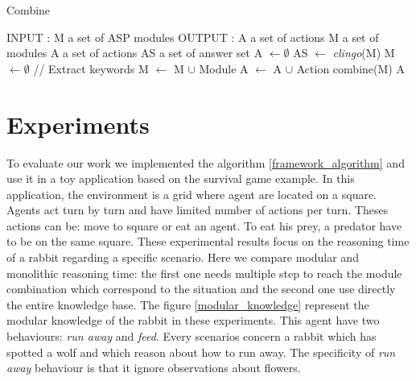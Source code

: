 \documentclass{aamas2012}
\begin{document}
	\begin{algorithm}
	\caption{Combine}
	\label{framework_algorithm}
	\begin{algorithmic}[1]
	\STATE INPUT : M a set of ASP modules
	\STATE OUTPUT : A a set of actions
	\newline
	\STATE M a set of modules
	\STATE A a set of actions
	\STATE AS a set of answer set
	\newline
	\STATE A $\leftarrow \emptyset$
	\newline
	\STATE AS $\leftarrow$ \textit{clingo}(M)
		\STATE M $\leftarrow \emptyset$ 
		\newline
		\STATE // Extract keywords
				\STATE M $\leftarrow$ M $\cup$ Module
			\ENDIF
				\STATE A $\leftarrow$ A $\cup$ Action
			\ENDIF
		\ENDFOR
		\newline
			\STATE combine(M)
		\ENDIF
	\ENDFOR
	\newline
	\RETURN A
	\end{algorithmic}
	\end{algorithm}

\section{Experiments}

	To evaluate our work we implemented the algorithm \ref{framework_algorithm} and use it in a toy application based on the survival game example.
	In this application, the environment is a grid where agent are located on a square.
	Agents act turn by turn and have limited number of actions per turn.
	Theses actions can be: move to square or eat an agent.
	To eat his prey, a predator have to be on the same square.
	These experimental results focus on the reasoning time of a rabbit regarding a specific scenario.
	Here we compare modular and monolithic reasoning time: the first one needs multiple step to reach the module combination
	which correspond to the situation and the second one use directly the entire knowledge base.
	The figure \ref{modular_knowledge} represent the modular knowledge of the rabbit in these experiments.
	This agent have two behaviours: \textit{run away} and \textit{feed}.
	Every scenarios concern a rabbit which has spotted a wolf and which reason about how to run away.
	The specificity of \textit{run away} behaviour is that it ignore observations about flowers. 
	
\end{document}

